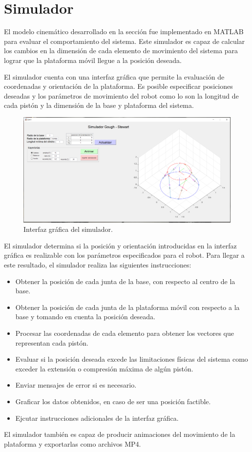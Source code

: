\section{Simulador}


El modelo cinemático desarrollado en la sección
 fue implementado en MATLAB
para evaluar el comportamiento del sistema.
Este simulador es capaz de calcular los cambios en 
la dimensión de cada elemento de movimiento del sistema
para lograr que la plataforma móvil 
llegue a la posición deseada.

El simulador cuenta con una interfaz gráfica que permite la 
evaluación de coordenadas y orientación de la plataforma.
Es posible especificar posiciones deseadas y 
los parámetros de movimiento del robot como lo son la
longitud de cada pistón y la dimensión de la base y 
plataforma del sistema.

\begin{figure}
 \centering
 \includegraphics[scale=0.2]{img/principal.png}
 \caption{Interfaz gráfica del simulador.}
 \label{fig: GUI}
\end{figure}


El simulador determina si la posición y 
orientación introducidas en la interfaz gráfica
es realizable con los parámetros especificados para
el robot. Para llegar a este resultado, el simulador realiza
las siguientes instrucciones:

\begin{itemize}
 \item Obtener la posición de cada junta de la base,
 con respecto al centro de la base.
 \item Obtener la posición de cada junta de la
 plataforma móvil con respecto a la base y tomando
 en cuenta la posición deseada.
 \item Procesar las coordenadas de cada elemento para 
 obtener los vectores que representan cada pistón.
 \item Evaluar si la posición deseada excede las 
 limitaciones físicas del sistema como exceder la 
 extensión o compresión máxima de algún pistón.
 \item Enviar mensajes de error si es necesario.
 \item Graficar los datos obtenidos, en caso de ser una
 posición factible.
 \item Ejcutar instrucciones adicionales 
 de la interfaz gráfica.
\end{itemize}

El simulador también es capaz de producir animaciones del 
movimiento de la plataforma y exportarlas como 
archivos MP4.
